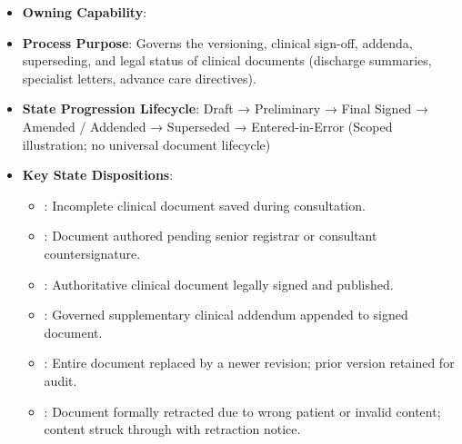 \begin{itemize}

\item 
\textbf{Owning Capability}: \texttt{}



\item 
\textbf{Process Purpose}: Governs the versioning, clinical sign-off, addenda, superseding, and legal status of clinical documents (discharge summaries, specialist letters, advance care directives).



\item 
\textbf{State Progression Lifecycle}: Draft → Preliminary → Final Signed → Amended /\allowbreak{} Addended → Superseded → Entered-in-Error   (Scoped illustration; no universal document lifecycle)



\item 
\textbf{Key State Dispositions}:


\begin{itemize}

\item 
\texttt{}: Incomplete clinical document saved during consultation.



\item 
\texttt{}: Document authored pending senior registrar or consultant countersignature.



\item 
\texttt{}: Authoritative clinical document legally signed and published.



\item 
\texttt{}: Governed supplementary clinical addendum appended to signed document.



\item 
\texttt{}: Entire document replaced by a newer revision; prior version retained for audit.



\item 
\texttt{}: Document formally retracted due to wrong patient or invalid content; content struck through with retraction notice.




\end{itemize}
\end{itemize}
